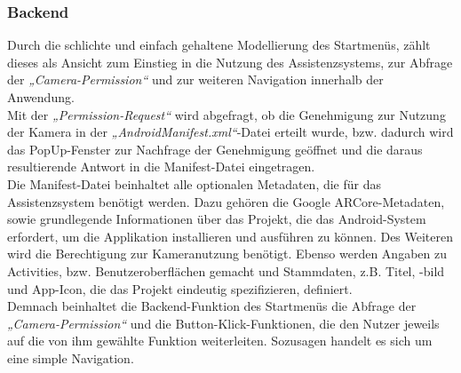 \subsubsection{Backend}
Durch die schlichte und einfach gehaltene Modellierung des Startmenüs, zählt dieses als Ansicht zum Einstieg in die Nutzung des Assistenzsystems, zur Abfrage der 
\textit{„Camera-Permission“} und zur weiteren Navigation innerhalb der Anwendung.
\\ 
Mit der \textit{„Permission-Request“} wird abgefragt, ob die Genehmigung zur Nutzung der Kamera in der \textit{„AndroidManifest.xml“}-Datei erteilt wurde, bzw. 
dadurch wird das PopUp-Fenster zur Nachfrage der Genehmigung geöffnet und die daraus resultierende Antwort in die Manifest-Datei eingetragen. 
\\ 
\linebreak
Die Manifest-Datei beinhaltet alle optionalen Metadaten, die für das Assistenzsystem benötigt werden. Dazu gehören die Google ARCore-Metadaten, sowie 
grundlegende Informationen über das Projekt, die das Android-System erfordert, um die Applikation installieren und ausführen zu können. Des Weiteren wird 
die Berechtigung zur Kameranutzung benötigt. Ebenso werden Angaben zu Activities, bzw. Benutzeroberflächen gemacht und Stammdaten, z.B. Titel, -bild und 
App-Icon, die das Projekt eindeutig spezifizieren, definiert.
\\ 
\linebreak
Demnach beinhaltet die Backend-Funktion des Startmenüs die Abfrage der \textit{„Camera-Permission“} und die Button-Klick-Funktionen, die den Nutzer 
jeweils auf die von ihm gewählte Funktion weiterleiten. Sozusagen handelt es sich um eine simple Navigation.

